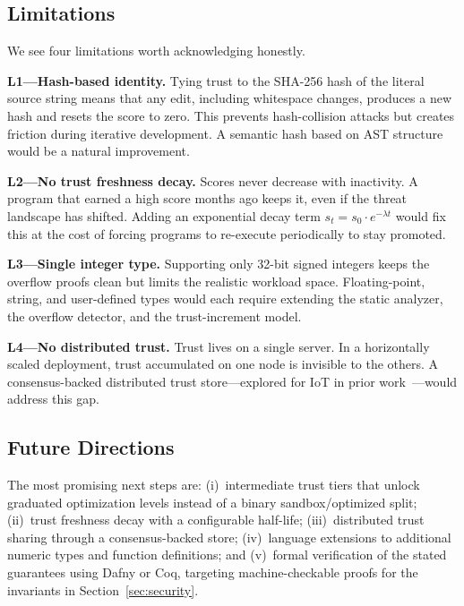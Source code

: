 \documentclass[conference]{IEEEtran}
\begin{document}
\subsection{Limitations}

We see four limitations worth acknowledging honestly.

\textbf{L1---Hash-based identity.}  Tying trust to the SHA-256
hash of the literal source string means that any edit, including
whitespace changes, produces a new hash and resets the score to
zero.  This prevents hash-collision attacks but creates friction
during iterative development.  A semantic hash based on AST
structure would be a natural improvement.

\textbf{L2---No trust freshness decay.}  Scores never decrease
with inactivity.  A program that earned a high score months ago
keeps it, even if the threat landscape has shifted.  Adding an
exponential decay term $s_t = s_0 \cdot e^{-\lambda t}$ would
fix this at the cost of forcing programs to re-execute
periodically to stay promoted.

\textbf{L3---Single integer type.}  Supporting only 32-bit
signed integers keeps the overflow proofs clean but limits the
realistic workload space.  Floating-point, string, and
user-defined types would each require extending the static
analyzer, the overflow detector, and the trust-increment model.

\textbf{L4---No distributed trust.}  Trust lives on a single
server.  In a horizontally scaled deployment, trust accumulated
on one node is invisible to the others.  A consensus-backed
distributed trust store---explored for IoT in prior
work~\cite{ullah2024deeptrust,fernandez2024sla}---would address
this gap.

\subsection{Future Directions}

The most promising next steps are: (i)~intermediate trust tiers
that unlock graduated optimization levels instead of a binary
sandbox/optimized split; (ii)~trust freshness decay with a
configurable half-life; (iii)~distributed trust sharing through
a consensus-backed store; (iv)~language extensions to
additional numeric types and function definitions; and
(v)~formal verification of the stated guarantees using Dafny or
Coq, targeting machine-checkable proofs for the invariants in
Section~\ref{sec:security}.

\end{document}
